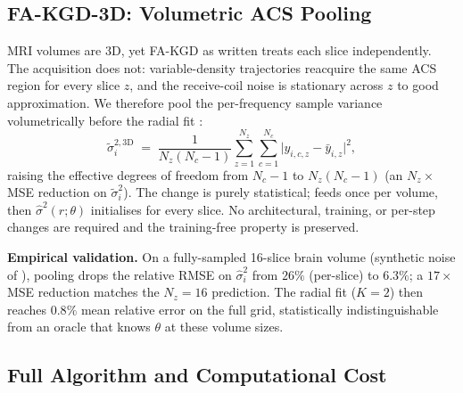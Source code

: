 \documentclass[10pt,twocolumn,letterpaper]{article}
\newcommand{\hatsig}{\hat{\sigma}}
\begin{document}
\subsection{FA-KGD-3D: Volumetric ACS Pooling}
\label{sec:fakgd3d}

MRI volumes are 3D, yet FA-KGD as written treats each slice independently. The
acquisition does not: variable-density trajectories reacquire the same ACS
region for every slice $z$, and the receive-coil noise is stationary across $z$
to good approximation. We therefore pool the per-frequency sample variance
volumetrically before the radial fit :
\begin{equation}
  \tilde\sigma_i^{2,\text{3D}} \;=\; \frac{1}{N_z(N_c-1)}
  \sum_{z=1}^{N_z}\sum_{c=1}^{N_c}
  \bigl|y_{i,c,z} - \bar y_{i,z}\bigr|^2,
  \label{eq:acs3d}
\end{equation}
raising the effective degrees of freedom from $N_c{-}1$ to $N_z(N_c{-}1)$ (an
$N_z\times$ MSE reduction on $\tilde\sigma_i^2$). The change is purely
statistical;  feeds  once per volume,
then $\hatsig^2(r;\theta)$ initialises  for every slice. No
architectural, training, or per-step changes are required and the training-free
property is preserved.

\textbf{Empirical validation.} On a fully-sampled 16-slice brain volume
(synthetic noise of ), pooling drops the relative RMSE
on $\hatsig_i^2$ from $26\%$ (per-slice) to $6.3\%$; a $17\times$ MSE
reduction matches the $N_z\!=\!16$ prediction. The radial fit ($K{=}2$)
then reaches $0.8\%$ mean relative error on the full grid, statistically
indistinguishable from an oracle that knows $\theta$ at these volume sizes.

\subsection{Full Algorithm and Computational Cost}
\end{document}
